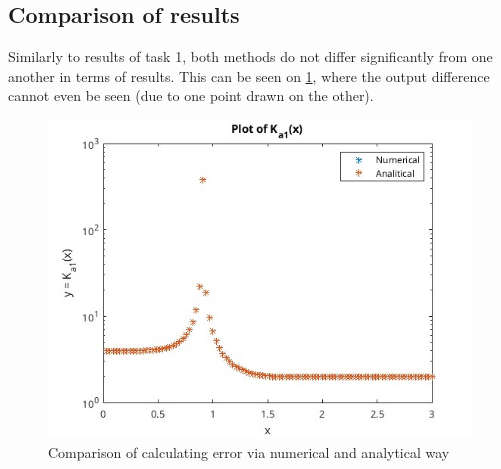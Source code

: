 \subsection{Comparison of results}
Similarly to results of task 1, both methods do not differ significantly from
one another in terms of results. This can be seen on \ref{fig:task2}, where the
output difference cannot even be seen (due to one point drawn on the other).

\begin{figure}[ht]
    \begin{center}
        \includegraphics[width=\textwidth]{Task2.jpg}
    \end{center}
    \caption{Comparison of calculating error via numerical and analytical way}
    \label{fig:task2}
\end{figure}
